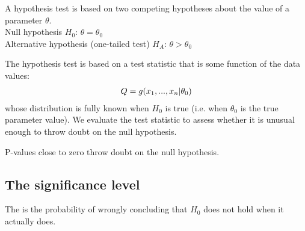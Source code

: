 A hypothesis test is based on two competing hypotheses about the value of a parameter $\theta$. \\
Null hypothesis $H_0$: $\theta = \theta_0$ \\
Alternative hypothesis (one-tailed test) $H_A$: $\theta > \theta_0$

The hypothesis test is based on a test statistic that is some function of the data values:
\begin{align}
    Q = g(x_1,...,x_n\vert\theta_0) \notag
\end{align}
whose distribution is fully known when $H_0$ is true (i.e. when $\theta_0$ is the true parameter value). We evaluate the test statistic to assess whether it is unusual enough to throw doubt on the null hypothesis.

\begin{center}
\end{center}

\begin{theorem}
    P-values close to zero throw doubt on the null hypothesis.
\end{theorem}

\subsection{The significance level}

\begin{definition}
    The  is the probability of wrongly concluding that $H_0$ does not hold when it actually does.
\end{definition}

